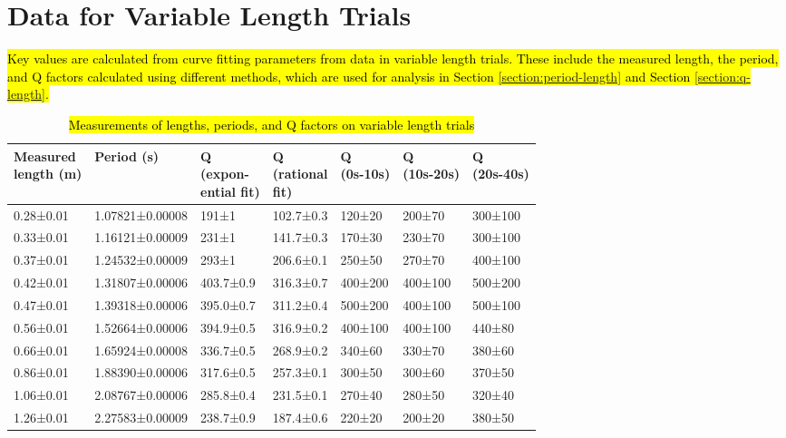 \documentclass[12pt]{article}
\DeclareRobustCommand{\hlnew}[1]{{\sethlcolor{hlcnew}\hl{#1}}}
\begin{document}
\section{Data for Variable Length Trials} \label{appendix:variable-length}

\hlnew{Key values are calculated from curve fitting parameters from data in variable length trials. These include the measured length, the period, and Q factors calculated using different methods, which are used for analysis in Section {\ref{section:period-length}} and Section {\ref{section:q-length}}.}

\begin{table}[h]
\begin{tabularx}{\textwidth}{ |l|X|l|l|l|l|l| }
\hline
\makecell[l]{Measured\\length (m)} &
Period (s) &
\makecell[l]{Q\\(expon-\\ential fit)} &
\makecell[l]{Q\\(rational\\fit)} &
\makecell[l]{Q\\(0s-10s)} &
\makecell[l]{Q\\(10s-20s)} &
\makecell[l]{Q\\(20s-40s)}
\\ \hline
0.28±0.01 &
1.07821±0.00008 &
191±1 & 102.7±0.3 & 120±20 & 200±70 & 300±100
\\ \hline
0.33±0.01 &
1.16121±0.00009 &
231±1 & 141.7±0.3 & 170±30 & 230±70 & 300±100
\\ \hline
0.37±0.01 &
1.24532±0.00009 &
293±1 & 206.6±0.1 & 250±50 & 270±70 & 400±100
\\ \hline
0.42±0.01 &
1.31807±0.00006 &
403.7±0.9 & 316.3±0.7 & 400±200 & 400±100 & 500±200
\\ \hline
0.47±0.01 &
1.39318±0.00006 &
395.0±0.7 & 311.2±0.4 & 500±200 & 400±100 & 500±100
\\ \hline
0.56±0.01 &
1.52664±0.00006 &
394.9±0.5 & 316.9±0.2 & 400±100 & 400±100 & 440±80
\\ \hline
0.66±0.01 &
1.65924±0.00008 &
336.7±0.5 & 268.9±0.2 & 340±60 & 330±70 & 380±60
\\ \hline
0.86±0.01 &
1.88390±0.00006 &
317.6±0.5 & 257.3±0.1 & 300±50 & 300±60 & 370±50
\\ \hline
1.06±0.01 &
2.08767±0.00006 &
285.8±0.4 & 231.5±0.1 & 270±40 & 280±50 & 320±40
\\ \hline
1.26±0.01 &
2.27583±0.00009 &
238.7±0.9 & 187.4±0.6 & 220±20 & 200±20 & 380±50
\\ \hline
\end{tabularx}
\caption{\hlnew{Measurements of lengths, periods, and Q factors on variable length trials}}
\label{table:variable-length}
\end{table}
\end{document}
